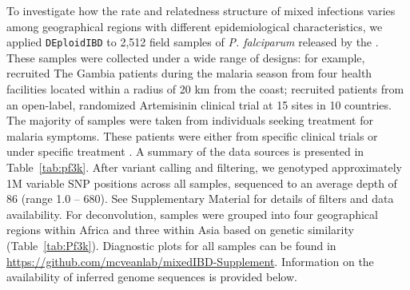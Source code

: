 \documentclass[9pt,lineno]{elife}
\begin{document}
To investigate how the rate and relatedness structure of mixed infections varies among geographical regions with different epidemiological characteristics, we applied \texttt{DEploidIBD} to 2,512 field samples of {\it P. falciparum} released by the \citet{pf3k}.  These samples were collected under a wide range of designs: for example, \citet{Amambua-Ngwa2012} recruited The Gambia patients during the malaria season from four health facilities located within a radius of 20 km from the coast; \citet{Ashley2014} recruited patients from an open-label, randomized Artemisinin clinical trial at 15 sites in 10 countries. The majority of samples were taken from individuals seeking treatment for malaria symptoms. These patients were either from specific clinical trials \citep{Ocholla2014} or under specific treatment \citep{Duffy2015, Miotto2013,eLife2016}.  A summary of the data sources is presented in Table~\ref{tab:pf3k}.  After variant calling and filtering, we genotyped approximately 1M variable SNP positions across all samples, sequenced to an average depth of 86 (range 1.0 – 680).  See Supplementary Material for details of filters and data availability.  For deconvolution, samples were grouped into four geographical regions within Africa and three within Asia based on genetic similarity (Table~\ref{tab:Pf3k}).  Diagnostic plots for all samples can be found in \url{https://github.com/mcveanlab/mixedIBD-Supplement}.  Information on the availability of inferred genome sequences is provided below.
\end{document}
